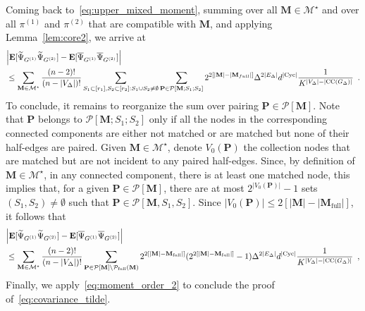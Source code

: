 \documentclass{article}
\begin{document}
    
    
    
     
    
    Coming back to~\eqref{eq:upper_mixed_moment}, summing over all $\mathbf{M}\in \mathcal{M}^{\star}$ and over all $\pi^{(1)}$ and $\pi^{(2)}$ that are compatible with $\mathbf{M}$, and applying Lemma~\ref{lem:core2}, we arrive at 
        \begin{align*}
     \lefteqn{       \left|\mathbf E[\widetilde{\Psi}_{G^{(1)}}\widetilde{\Psi}_{G^{(2)}}]- \mathbf E[\overline{\Psi}_{G^{(1)}}\overline{\Psi}_{G^{(2)}}]\right|} &\\ 
            &\leq \sum_{\mathbf M\in \mathcal{M}^{\star}} \frac{(n-2)!}{(n-|V_{\Delta}|)!}  \sum_{S_1 \subset [r_1], S_2\subset [r_2]: S_1\cup S_2 \neq \emptyset} \sum_{\mathbf{P}\in \mathcal{P}[\mathbf{M};S_1;S_2]}2^{2[|\mathbf{M}| - |\mathbf{M}_{full}|]} \Delta^{2|E_{\Delta}|}d^{|\mathrm{Cyc}|}\frac{1}{K^{|V_{\Delta}|-|\mathrm{CC}(G_{\Delta})|}} \enspace . 
        \end{align*}
    To conclude, it remains to reorganize the sum over pairing $\mathbf{P}\in \mathcal{P}[\mathbf{M}]$. Note that $\mathbf{P}$ belongs to $\mathcal{P}[\mathbf{M};S_1;S_2]$ only if all the nodes in the corresponding connected components are either not matched or are matched but none of their half-edges are paired. Given $\mathbf{M}\in \mathcal{M}^{\star}$, denote $V_0(\mathbf{P})$ the collection nodes  that are matched but are not incident to  any paired half-edges.
    Since, by definition of $\mathbf{M}\in \mathcal{M}^{\star}$, in any connected component, there is at least one matched node, this implies that, for a given $\mathbf{P}\in \mathcal{P}[\mathbf{M}]$, there are at most $2^{|V_0(\mathbf{P})|}-1$ sets  $(S_1,S_2)\neq \emptyset$ such that $\mathbf{P}\in \mathcal{P}[\mathbf{M},S_1,S_2]$. Since $|V_0(\mathbf{P})|\leq 2[|\mathbf{M}|- |\mathbf{M}_{\mathrm{full}}|]$, it follows that 
    \begin{align*}
         \lefteqn{       \left|\mathbf E[\widetilde{\Psi}_{G^{(1)}}\widetilde{\Psi}_{G^{(2)}}]- \mathbf E[\overline{\Psi}_{G^{(1)}}\overline{\Psi}_{G^{(2)}}]\right|} &\\ 
            &\leq \sum_{\mathbf M\in \mathcal{M}^{\star}} \frac{(n-2)!}{(n-|V_{\Delta}|)!}\sum_{\mathbf{P}\in \mathcal{P}[\mathbf{M}]\setminus \mathcal{P}_{\mathrm{full}}(\mathbf{M})}2^{2[|\mathbf{M}|- \mathbf{M}_{\mathrm{full}}|]}(2^{2[|\mathbf{M}|- \mathbf{M}_{\mathrm{full}}|]}-1)\Delta^{2|E_{\Delta}|}d^{|\mathrm{Cyc}|}\frac{1}{K^{|V_{\Delta}|-|\mathrm{CC}(G_{\Delta})|}}\enspace , 
             \end{align*}
    Finally, we apply~\eqref{eq:moment_order_2} to conclude the proof of~\eqref{eq:covariance_tilde}. 
 
\end{document}
